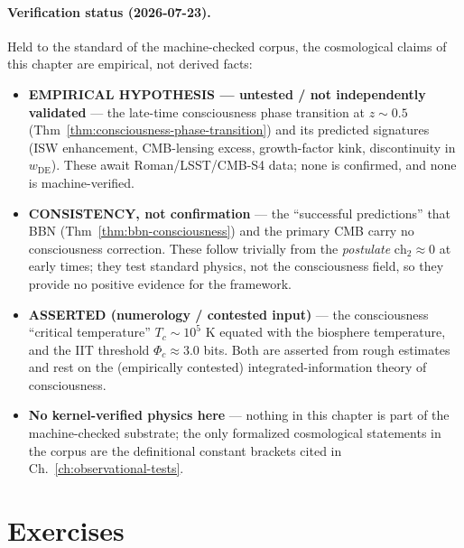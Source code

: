 \paragraph{Verification status (2026-07-23).}
Held to the standard of the machine-checked corpus, the cosmological claims of this
chapter are empirical, not derived facts:
\begin{itemize}
\item \textbf{EMPIRICAL HYPOTHESIS --- untested / not independently validated} ---
  the late-time consciousness phase transition at $z\sim0.5$
  (Thm~\ref{thm:consciousness-phase-transition}) and its predicted signatures
  (ISW enhancement, CMB-lensing excess, growth-factor kink, discontinuity in
  $w_{\text{DE}}$). These await Roman/LSST/CMB-S4 data; none is confirmed, and none
  is machine-verified.
\item \textbf{CONSISTENCY, not confirmation} --- the ``successful predictions'' that
  BBN (Thm~\ref{thm:bbn-consciousness}) and the primary CMB carry no consciousness
  correction. These follow trivially from the \emph{postulate} $\text{ch}_2\approx0$
  at early times; they test standard physics, not the consciousness field, so they
  provide no positive evidence for the framework.
\item \textbf{ASSERTED (numerology / contested input)} --- the consciousness
  ``critical temperature'' $T_c\sim10^5$ K equated with the biosphere temperature,
  and the IIT threshold $\Phi_c\approx3.0$ bits. Both are asserted from rough
  estimates and rest on the (empirically contested) integrated-information theory of
  consciousness.
\item \textbf{No kernel-verified physics here} --- nothing in this chapter is part
  of the machine-checked substrate; the only formalized cosmological statements in
  the corpus are the definitional constant brackets cited in
  Ch.~\ref{ch:observational-tests}.
\end{itemize}

\section*{Exercises}

